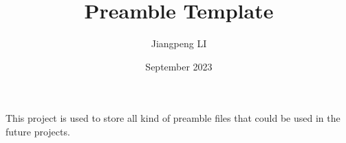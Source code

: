 \documentclass[12pt]{article}
\title{Preamble Template}
\author{Jiangpeng LI}
\date{September 2023}
\begin{document}
\maketitle

This project is used to store all kind of preamble files that could be used in the future projects.
\end{document}
